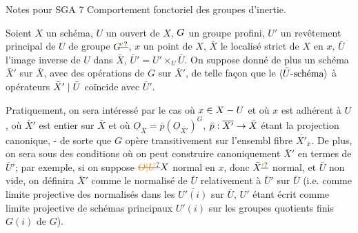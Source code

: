 Notes pour SGA 7
Comportement fonctoriel des groupes d'inertie.

 Soient $X$ un schéma, $U$ un ouvert de $X$, $G$ un groupe profini, $U'$ un
revêtement principal de $U$ de groupe $G\deleted{\unsure{'}}$, $x$ un point  de $X$, $\bar X$ le localisé
strict de $X$ en $x$, $\bar U$ l'image inverse de $U$ dans $\bar X$, $\bar U'=U'\times_U\bar U$. On suppose
donné de plus un schéma $\bar X'$ sur $\bar X$, avec des opérations de $G$ sur $\bar X'$, de
telle façon que le $\inserted{\bar U\text{-schéma}}$ à opérateurs $\bar X'\mid\bar U$ coïncide avec $\bar U'$.

Pratiquement, on sera intéressé par le cas où $x\in X-U$ et où $x$ est
adhérent à $U$, où $\bar X'$ est entier sur $\bar X$ et où $\underline O_{\bar X}=\bar p(\underline O_{\overline{X'}})^G$, $\bar p:\overline{X'}\to\bar X$ étant
la projection canonique, - de sorte que $G$ opère transitivement sur
l'ensembl fibre $\overline{X'}_{\bar x}$. De plus, on  sera  sous des conditions où
on peut construire canoniquement $\bar X'$ en termes de $\bar U'$; par exemple, si on
suppose $\deleted{\unsure{O|U}}X$ normal en $x$, donc $\bar X\deleted{\unsure{'}}$ normal, et $\bar U$ non vide, on définira $\bar X'$ comme
le normalisé de $\bar U$ relativement à $\bar U'$ sur $\bar U$ (i.e. comme limite projective
des normalisés dans les $\overline{U'(i)}$ sur $\bar U$, $U'$ étant écrit comme limite projective de schémas principaux $U'(i)$ sur les groupes quotients finis $G(i)$ de
$G$).

